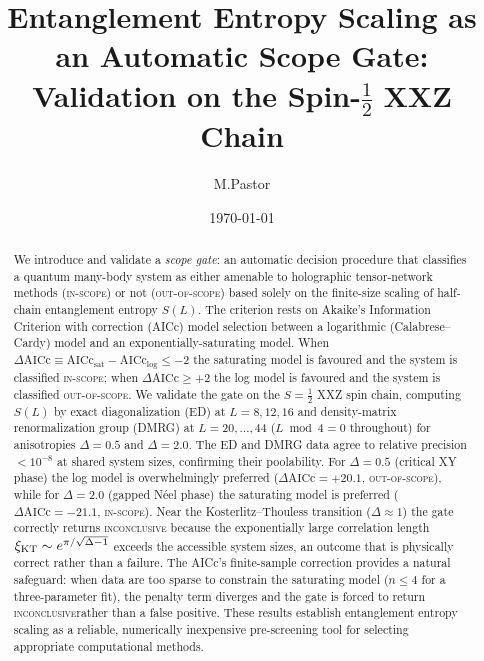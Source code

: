 \documentclass[11pt,letterpaper]{article}
\title{\textbf{Entanglement Entropy Scaling as an Automatic Scope Gate:\\
Validation on the Spin-$\tfrac{1}{2}$ XXZ Chain}}
\author{M.\;Pastor}
\date{\today}
\newcommand{\dAICc}{\Delta\mathrm{AICc}}
\newcommand{\half}{\tfrac{1}{2}}
\newcommand{\Neel}{N\'{e}el}
\newcommand{\inscope}{\textsc{in-scope}}
\newcommand{\outscope}{\textsc{out-of-scope}}
\newcommand{\inconclusive}{\textsc{inconclusive}}
\begin{document}
\maketitle
\thispagestyle{empty}

\begin{abstract}
We introduce and validate a \emph{scope gate}: an automatic decision procedure
that classifies a quantum many-body system as either amenable to
holographic tensor-network methods (\inscope) or not (\outscope) based
solely on the finite-size scaling of half-chain entanglement entropy $S(L)$.
The criterion rests on Akaike's Information Criterion with correction (AICc)
model selection between a logarithmic (Calabrese–Cardy) model and an
exponentially-saturating model.  When $\dAICc \equiv \mathrm{AICc}_{\mathrm{sat}}
- \mathrm{AICc}_{\log} \le -2$ the saturating model is favoured and the system
is classified \inscope; when $\dAICc \ge +2$ the log model is favoured and the
system is classified \outscope.  We validate the gate on the $S=\half$ XXZ
spin chain, computing $S(L)$ by exact diagonalization (ED) at $L=8,12,16$
and density-matrix renormalization group (DMRG) at $L=20,\ldots,44$
($L \bmod 4 = 0$ throughout) for anisotropies $\Delta = 0.5$ and $\Delta = 2.0$.
The ED and DMRG data agree to relative precision $< 10^{-8}$ at shared system
sizes, confirming their poolability.  For $\Delta = 0.5$ (critical XY phase)
the log model is overwhelmingly preferred ($\dAICc = +20.1$, \outscope),
while for $\Delta = 2.0$ (gapped \Neel{} phase) the saturating model is
preferred ($\dAICc = -21.1$, \inscope).  Near the Kosterlitz–Thouless
transition ($\Delta \approx 1$) the gate correctly returns \inconclusive
because the exponentially large correlation length $\xi_{\rm KT} \sim
e^{\pi/\sqrt{\Delta-1}}$ exceeds the accessible system sizes, an outcome that
is physically correct rather than a failure.  The AICc's finite-sample
correction provides a natural safeguard: when data are too sparse to constrain
the saturating model ($n \le 4$ for a three-parameter fit), the penalty term
diverges and the gate is forced to return \inconclusive rather than a false
positive.  These results establish entanglement entropy scaling as a
reliable, numerically inexpensive pre-screening tool for selecting appropriate
computational methods.
\end{abstract}

\newpage
\tableofcontents
\newpage

\end{document}
